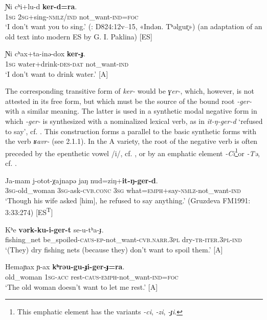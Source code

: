 \documentclass[output=paper,colorlinks,citecolor=brown]{langscibook}
\begin{document}
\ea\label{ex:niv:82}
    \gll Ɲi cʰi+lu-d \textbf{ker-d=ra}. \\ 
         \textsc{1sg} 2\textsc{sg}+sing-\textsc{nmlz/ind} not\_want-\textsc{ind=foc} \\
    \glt ‘I don’t want you to sing.’ (\cite{KreinovichMs}: D824:12v–15, «Indən. Tʰəlgur̥») (an adaptation of an old text into modern ES by G. I. Paklina) [ES]
\z 

\ea\label{ex:niv:83}
    \gll Ɲi cʰax+ta-inə{}-dox \textbf{ker-ɟ}. \\ 
         \textsc{1sg} water+drink-\textsc{des-dat} not\_want-\textsc{ind} \\
    \glt ‘I don’t want to drink water.’ \citep[162]{Panfilov1965} [A]
\z 

The corresponding transitive form of \textit{ker-} would be \textit{ɣer-}, which, however, is not attested in its free form, but which must be the source of the bound root \textit{-ger-} with a similar meaning. The latter is used in a synthetic modal negative form in which \textit{-ger-} is synthesized with a nominalized lexical verb, as in \textit{it-ŋ-ger-d} ‘refused to say’, cf. . This construction forms a parallel to the basic synthetic forms with the verb \textit{ʁavr-} (see 2.1.1). In the A variety, the root of the negative verb is often preceded by the epenthetic vowel /i/, cf. , or by an emphatic element \textit{-Ci}\footnote{This emphatic element has the variants \textit{-ci}, \textit{-zi}, \textit{-ɟi}.}or \textit{-Tə}, cf. .

\ea\label{ex:niv:84}
    \gll Ja-mam j-otot-χajnapə jaŋ nud=ziŋ+\textbf{it-ŋ-ger-d}. \\ 
         \textsc{3sg-}old\_woman \textsc{3sg}{}-ask-\textsc{cvb.conc} \textsc{3sg} what=\textsc{emph}+say-\textsc{nmlz}{}-not\_want-\textsc{ind} \\
    \glt ‘Though his wife asked [him], he refused to say anything.’ (Gruzdeva FM1991: 3:33:274) [ES\textsuperscript{T}]
\z 

\ea\label{ex:niv:85}
    \gll Kʰe \textbf{vərk-ku-i-ger-t} se-u-tʰa-ɟ. \\ 
         fishing\_net be\_spoiled-\textsc{caus-ep}{}-not\_want-\textsc{cvb.narr.3pl} dry-\textsc{tr-iter.3pl-ind} \\
    \glt ‘(They) dry fishing nets (because they) don’t want to spoil them.’ \citep[162]{Panfilov1965} [A]
\z 

\ea\label{ex:niv:86}
    \gll Hemaɲax ɲ{}-ax \textbf{kʰrəu-gu-ɟi-ger-ɟ=ra}. \\ 
         old\_woman \textsc{1sg}{}-\textsc{acc} rest-\textsc{caus-emph}{}-not\_want-\textsc{ind=foc} \\
    \glt ‘The old woman doesn’t want to let me rest.’ \citep[162]{Panfilov1965} [A]
\z 
\end{document}
